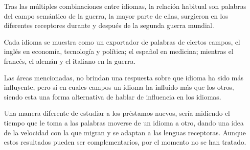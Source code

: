 Tras las múltiples combinaciones entre idiomas, la relación habitual son palabras del campo semántico de la guerra, la mayor parte de ellas, surgieron en los diferentes receptores durante y después de la segunda guerra mundial. 

Cada idioma se muestra como un exportador de palabras de ciertos campos,  el inglés en economía, tecnología y política; el español en medicina; mientras el francés, el alemán y el italiano en la guerra.  

Las áreas mencionadas, no brindan una respuesta sobre que idioma ha sido más influyente, pero si en cuales campos un idioma ha influido más que los otros, siendo esta una forma alternativa de hablar de influencia en los idiomas.
 
Una manera diferente de estudiar a los préstamos nuevos, sería midiendo el tiempo que le toma a las palabras moverse de un idioma a otro, dando una idea de la velocidad con la que migran y se adaptan a las lenguas receptoras. Aunque estos resultados pueden ser complementarios, por el momento no se han tratado. 



















